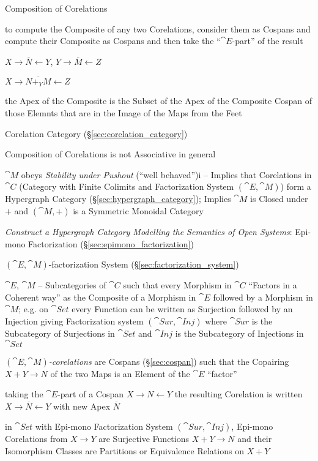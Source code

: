 Composition of Corelations

to compute the Composite of any two Corelations, consider them as
Cospans and compute their Composite as Cospans and then take the
``$\cat{E}$-part'' of the result %

$X \rightarrow \overline{N} \leftarrow Y$, $Y \rightarrow \overline{M}
\leftarrow Z$

$X \rightarrow \overline{N +_Y M} \leftarrow Z$

the Apex of the Composite is the Subset of the Apex of the Composite
Cospan of those Elemnts that are in the Image of the Maps from the
Feet %

Corelation Category (\S\ref{sec:corelation_category})

Composition of Corelations is not Associative in general

$\cat{M}$ obeys \emph{Stability under Pushout} (``well behaved'')i --
Implies that Corelations in $\cat{C}$ (Category with Finite Colimits
and Factorization System $(\cat{E},\cat{M})$) form a Hypergraph
Category (\S\ref{sec:hypergraph_category}); Implies $\cat{M}$ is
Closed under $+$ and $(\cat{M},+)$ is a Symmetric Monoidal Category

\emph{Construct a Hypergraph Category Modelling the Semantics of Open
  Systems}: Epi-mono Factorization (\S\ref{sec:epimono_factorization})


$(\cat{E},\cat{M})$-factorization System
(\S\ref{sec:factorization_system})

$\cat{E}$, $\cat{M}$ -- Subcategories of $\cat{C}$ such that every
Morphism in $\cat{C}$ ``Factors in a Coherent way'' as the Composite
of a Morphism in $\cat{E}$ followed by a Morphism in $\cat{M}$; e.g.
on $\cat{Set}$ every Function can be written as Surjection followed by
an Injection giving Factorization system $(\cat{Sur},\cat{Inj})$ where
$\cat{Sur}$ is the Subcategory of Surjections in $\cat{Set}$ and
$\cat{Inj}$ is the Subcategory of Injections in $\cat{Set}$

\emph{$(\cat{E},\cat{M})$-corelations} are Cospans
(\S\ref{sec:cospan}) such that the Copairing $X + Y \rightarrow N$ of
the two Maps is an Element of the $\cat{E}$ ``factor''

taking the $\cat{E}$-part of a Cospan $X \rightarrow N \leftarrow Y$
the resulting Corelation is written $X \rightarrow \overline{N}
\leftarrow Y$ with new Apex $\overline{N}$

in $\cat{Set}$ with Epi-mono Factorization System $(\cat{Sur},
\cat{Inj})$, Epi-mono Corelations from $X \rightarrow Y$ are
Surjective Functions $X + Y \rightarrow N$ and their Isomorphism
Classes are Partitions or Equivalence Relations on $X + Y$

